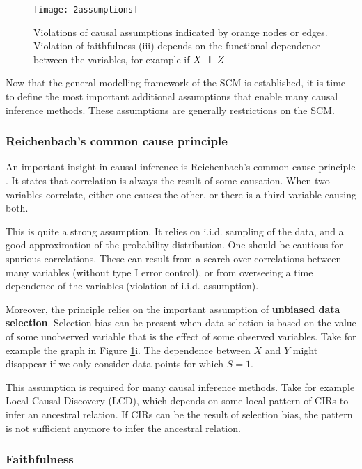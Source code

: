 \begin{figure}[h]
    \centering
    \texttt{[image: 2assumptions]}
    \caption{Violations of causal assumptions indicated by orange nodes or edges. Violation of faithfulness (iii) depends on the functional dependence between the variables, for example if $X \operatorname*{{\,\perp\mkern-12mu\perp\,}} Z$}
    \label{fig:2:ass}
\end{figure}

Now that the general modelling framework of the SCM is established, it is time to define the most important additional assumptions that enable many causal inference methods. These assumptions are generally restrictions on the SCM.

\subsubsection{Reichenbach's common cause principle}

An important insight in causal inference is Reichenbach's common cause principle \citep{reichenbach1956direction}. It states that correlation is always the result of some causation. When two variables correlate, either one causes the other, or there is a third variable causing both. 

This is quite a strong assumption. It relies on i.i.d. sampling of the data, and a good approximation of the probability distribution. One should be cautious for spurious correlations. These can result from a search over correlations between many variables (without type I error control), or from overseeing a time dependence of the variables (violation of i.i.d. assumption). 

Moreover, the principle relies on the important assumption of \textbf{unbiased data selection}. Selection bias can be present when data selection is based on the value of some unobserved variable that is the effect of some observed variables. Take for example the graph in Figure \ref{fig:2:ass}i. The dependence between $X$ and $Y$ might disappear if we only consider data points for which $S=1$. 

This assumption is required for many causal inference methods. Take for example Local Causal Discovery (LCD), which depends on some local pattern of CIRs to infer an ancestral relation. If CIRs can be the result of selection bias, the pattern is not sufficient anymore to infer the ancestral relation.


\subsubsection{Faithfulness}


